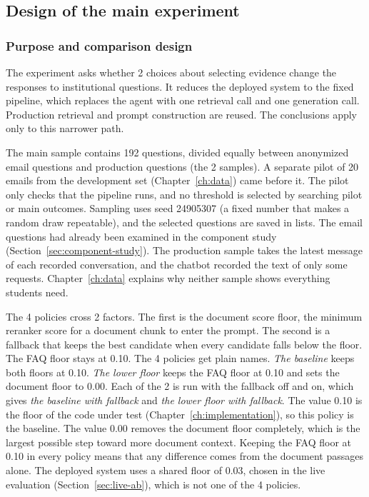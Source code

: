 \subsection{Design of the main experiment}

\subsubsection{Purpose and comparison design}

The experiment asks whether 2 choices about selecting evidence change the responses to institutional questions. It reduces the deployed system to the fixed pipeline, which replaces the agent with one retrieval call and one generation call. Production retrieval and prompt construction are reused. The conclusions apply only to this narrower path.

The main sample contains 192 questions, divided equally between anonymized email questions and production questions (the 2 samples). A separate pilot of 20 emails from the development set (Chapter~\ref{ch:data}) came before it. The pilot only checks that the pipeline runs, and no threshold is selected by searching pilot or main outcomes. Sampling uses seed 24905307 (a fixed number that makes a random draw repeatable), and the selected questions are saved in lists. The email questions had already been examined in the component study (Section~\ref{sec:component-study}). The production sample takes the latest message of each recorded conversation, and the chatbot recorded the text of only some requests. Chapter~\ref{ch:data} explains why neither sample shows everything students need.

The 4 policies cross 2 factors. The first is the document score floor, the minimum reranker score for a document chunk to enter the prompt. The second is a fallback that keeps the best candidate when every candidate falls below the floor. The FAQ floor stays at 0.10. The 4 policies get plain names. \emph{The baseline} keeps both floors at 0.10. \emph{The lower floor} keeps the FAQ floor at 0.10 and sets the document floor to 0.00. Each of the 2 is run with the fallback off and on, which gives \emph{the baseline with fallback} and \emph{the lower floor with fallback}. The value 0.10 is the floor of the code under test (Chapter~\ref{ch:implementation}), so this policy is the baseline. The value 0.00 removes the document floor completely, which is the largest possible step toward more document context. Keeping the FAQ floor at 0.10 in every policy means that any difference comes from the document passages alone. The deployed system uses a shared floor of 0.03, chosen in the live evaluation (Section~\ref{sec:live-ab}), which is not one of the 4 policies.

